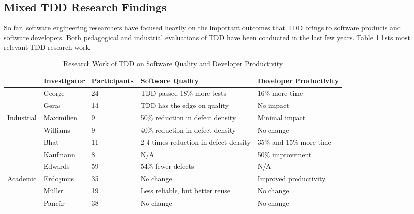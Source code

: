 \subsection{Mixed TDD Research Findings}
So far, software engineering researchers have focused heavily on the important outcomes that TDD brings to software products and software developers. Both pedagogical \cite{Muller:02,Edwards:04,Geras:04,Matjaz:03,Erdogmus:05,Kaufmann:03} and industrial \cite{George:03,Maximilien:03,Bhat:06} evaluations of TDD have been conducted in the last few years. Table \ref{tab:TDDResearchWork} lists most relevant TDD research work. 
\begin{table}[htbp]
\centering
  \caption{Research Work of TDD on Software Quality and Developer Productivity}
  \begin{tabular}{|l|l|p{2.3cm}|p{4cm}|l|} \hline 
 & Investigator	& Participants	& Software Quality	& Developer Productivity \\ \hline
 & George \cite{George:03}	& 24	& TDD passed 18\% more tests & 16\% more time \\ \cline{2-5}
 & Geras \cite{Geras:04}  &  14	& TDD has the edge on quality & No impact \\ \cline{2-5}
 Industrial
 & Maximilien	\cite{Maximilien:03}  &  9	& 50\% reduction in defect density	& Minimal impact \\ \cline{2-5}
 & Williams\cite{Williams:03} &  9	& 40\% reduction in defect density	& No change \\ \cline{2-5}
 & Bhat	\cite{Bhat:06}  & 11	& 2-4 times reduction in defect density	& 35\% and 15\% more time \\ 
 
 \hline \hline
 
         & Kaufmann \cite{Kaufmann:03}	&  8	& N/A	    & 50\% improvement \\ \cline{2-5}
         & Edwards \cite{Edwards:04} & 59	& 54\% fewer defects	& N/A \\ \cline{2-5}
Academic & Erdogmus	\cite{Erdogmus:05} & 35	& No change	  & Improved productivity \\ \cline{2-5}
         & M\"{u}ller \cite{Muller:02}& 19 & Less reliable, but better reuse	& No change \\ \cline{2-5}
         & Panc\v{u}r	\cite{Matjaz:03} & 38	& No change	  & No change \\ \hline
  \end{tabular}
  \label{tab:TDDResearchWork}
\end{table}
